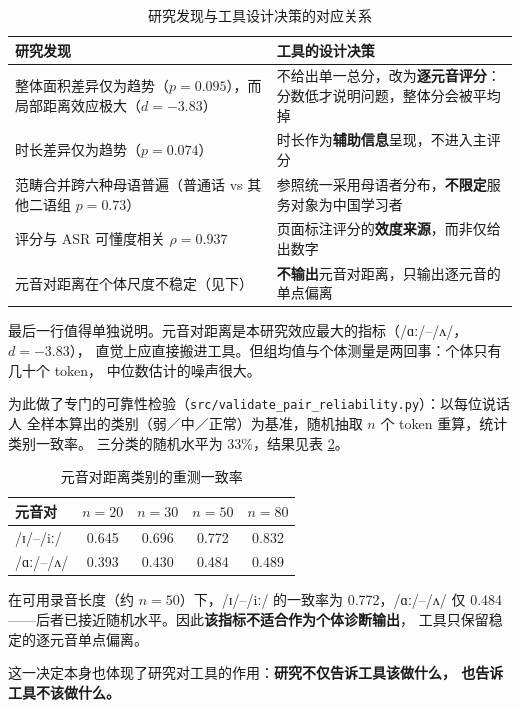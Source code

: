 \documentclass[12pt,a4paper,fontset=fandol]{ctexrep}
\newcommand{\ipa}[1]{/#1/}
\begin{document}
\begin{table}[H]
\centering
\caption{研究发现与工具设计决策的对应关系}
\label{tab:design}
\begin{tabular}{p{}p{}}
\toprule
研究发现 & 工具的设计决策 \\
\midrule
整体面积差异仅为趋势（$p=0.095$），而局部距离效应极大（$d=-3.83$）
& 不给出单一总分，改为\textbf{逐元音评分}：分数低才说明问题，整体分会被平均掉 \\
时长差异仅为趋势（$p=0.074$）
& 时长作为\textbf{辅助信息}呈现，不进入主评分 \\
范畴合并跨六种母语普遍（普通话 vs 其他二语组 $p=0.73$）
& 参照统一采用母语者分布，\textbf{不限定}服务对象为中国学习者 \\
评分与 ASR 可懂度相关 $\rho=0.937$
& 页面标注评分的\textbf{效度来源}，而非仅给出数字 \\
元音对距离在个体尺度不稳定（见下）
& \textbf{不输出}元音对距离，只输出逐元音的单点偏离 \\
\bottomrule
\end{tabular}
\end{table}

最后一行值得单独说明。元音对距离是本研究效应最大的指标（\ipa{ɑː}–\ipa{ʌ}，$d=-3.83$），
直觉上应直接搬进工具。但组均值与个体测量是两回事：个体只有几十个 token，
中位数估计的噪声很大。

为此做了专门的可靠性检验（\texttt{src/validate\_pair\_reliability.py}）：以每位说话人
全样本算出的类别（弱／中／正常）为基准，随机抽取 $n$ 个 token 重算，统计类别一致率。
三分类的随机水平为 33\%，结果见表 \ref{tab:reliab}。

\begin{table}[H]
\centering
\caption{元音对距离类别的重测一致率}
\label{tab:reliab}
\begin{tabular}{lcccc}
\toprule
元音对 & $n=20$ & $n=30$ & $n=50$ & $n=80$ \\
\midrule
\ipa{ɪ}–\ipa{iː} & 0.645 & 0.696 & 0.772 & 0.832 \\
\ipa{ɑː}–\ipa{ʌ} & 0.393 & 0.430 & 0.484 & 0.489 \\
\bottomrule
\end{tabular}
\end{table}

在可用录音长度（约 $n=50$）下，\ipa{ɪ}–\ipa{iː} 的一致率为 0.772，\ipa{ɑː}–\ipa{ʌ}
仅 0.484——后者已接近随机水平。因此\textbf{该指标不适合作为个体诊断输出}，
工具只保留稳定的逐元音单点偏离。

这一决定本身也体现了研究对工具的作用：\textbf{研究不仅告诉工具该做什么，
也告诉工具不该做什么。}
\end{document}
